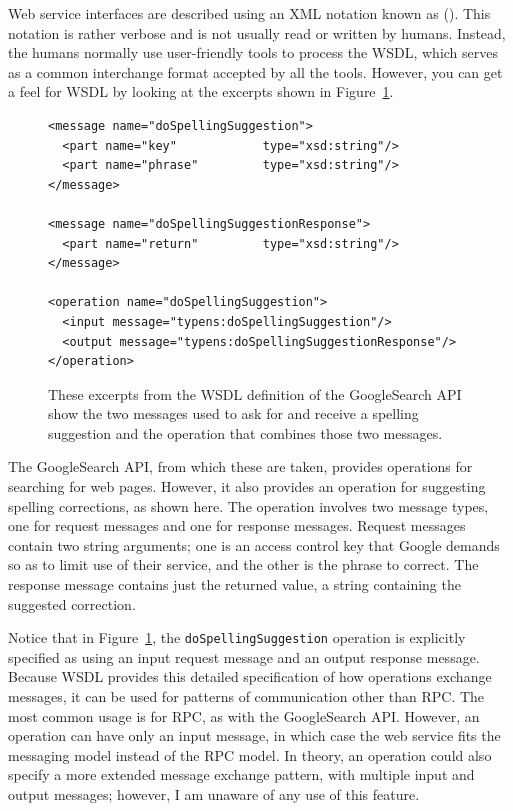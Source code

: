 Web service interfaces are described using an XML notation known as
 ().  This notation is rather
verbose and is not usually read or written by humans.  Instead,
the humans normally use user-friendly tools to process the WSDL, which
serves as a common interchange format accepted by all the tools.
However, you can get a feel for WSDL by looking at the excerpts shown
in Figure~\ref{example-WSDL-excerpt}.
\begin{figure}
\begin{verbatim}
<message name="doSpellingSuggestion">
  <part name="key"            type="xsd:string"/>
  <part name="phrase"         type="xsd:string"/>
</message>

<message name="doSpellingSuggestionResponse">
  <part name="return"         type="xsd:string"/>
</message>

<operation name="doSpellingSuggestion">
  <input message="typens:doSpellingSuggestion"/>
  <output message="typens:doSpellingSuggestionResponse"/>
</operation>
\end{verbatim}
\caption{These excerpts from the WSDL definition of the GoogleSearch API
  show the two messages used to ask for and receive a spelling
  suggestion and the operation that combines those two messages.}\label{example-WSDL-excerpt}
\end{figure}
The GoogleSearch API, from
which these are taken, provides operations for searching for web
pages.  However, it also provides an operation for suggesting spelling
corrections, as shown here.  The operation involves two message types,
one for request messages and one for response messages.  Request
messages contain two string arguments; one is an access control key
that Google demands so as to limit use of their
service, and the other is the phrase to correct.  The response message
contains just the returned value, a string containing the suggested
correction.

Notice that in Figure~\ref{example-WSDL-excerpt}, the \verb|doSpellingSuggestion|
operation is explicitly specified as using an input request message
and an output response message.  Because WSDL provides this detailed
specification of how operations exchange messages, it can be used for
patterns of communication other than RPC.  The most common usage is
for RPC, as with the GoogleSearch API.  However, an operation can have
only an input message, in which case the web service fits the
messaging model instead of the RPC model.  In theory, an operation
could also specify a more extended message exchange pattern, with
multiple input and output messages; however, I am unaware of any use of
this feature.

